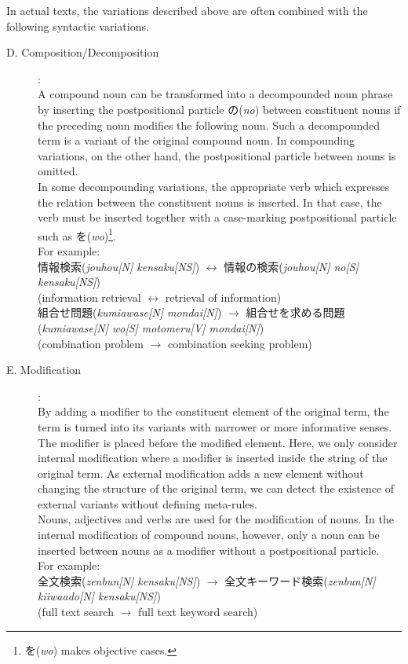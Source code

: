 In actual texts, the variations described above are often combined with the following syntactic variations.

\begin{description}

\item[D. Composition/Decomposition]:\\
A compound noun can be transformed into a decompounded noun phrase by inserting the postpositional particle の({\it no}) between constituent nouns if the preceding noun modifies the following noun. Such a decompounded term is a variant of the original compound noun. In compounding variations, on the other hand, the postpositional particle between nouns is omitted.\\
In some decompounding variations, the appropriate verb which expresses the relation between the constituent nouns is inserted. In that case, the verb must be inserted together with a case-marking postpositional particle such as を({\it wo})\footnote{を({\it wo}) makes objective cases.}.\\
For example:\\
情報検索({\it jouhou[N] kensaku[NS]}) $\leftrightarrow$ 情報の検索({\it jouhou[N] no[S] kensaku[NS]})\\
(information retrieval $\leftrightarrow$ retrieval of information)\\
組合せ問題({\it kumiawase[N] mondai[N]}) $\rightarrow$ 組合せを求める問題({\it kumiawase[N] wo[S] motomeru[V] mondai[N]})\\
(combination problem $\rightarrow$ combination seeking problem)\\

\item[E. Modification]:\\
By adding a modifier to the constituent element of the original term, the term is turned into its variants with narrower or more informative senses. The modifier is placed before the modified element. Here, we only consider internal modification where a modifier is inserted inside the string of the original term. As external modification adds a new element without changing the structure of the original term, we can detect the existence of external variants without defining meta-rules.\\
Nouns, adjectives and verbs are used for the modification of nouns. In the internal modification of compound nouns, however, only a noun can be inserted between nouns as a modifier without a postpositional particle.\\
For example:\\
全文検索({\it zenbun[N] kensaku[NS]}) $\rightarrow$ 全文キーワード検索({\it zenbun[N] kiiwaado[N] kensaku[NS]})\\
(full text search $\rightarrow$ full text keyword search)\\


\end{description}

